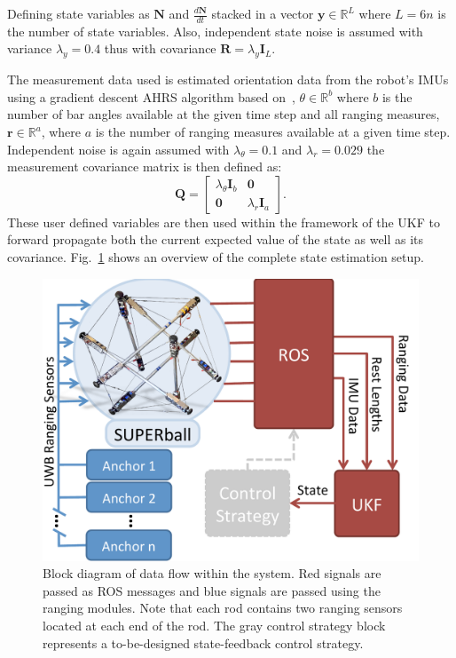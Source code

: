 {Defining state variables as $\boldsymbol{N}$ and $\frac{d\boldsymbol{N}}{dt}$ stacked in a vector $\boldsymbol{y}\in\mathbb{R}^{L}$ where $L = 6n$ is the number of state variables. 
Also, independent state noise is assumed with variance $\lambda_y = 0.4$ thus with covariance $\boldsymbol{R} = \lambda_y\bm{I}_L$.

The measurement data used is estimated orientation data from the robot's IMUs using a gradient descent AHRS algorithm based on~\cite{madgwick2011estimation}, $\theta\in\mathbb{R}^{b}$ where $b$ is the number of bar angles available at the given time step and all ranging measures, $\boldsymbol{r}\in\mathbb{R}^{a}$, where $a$ is the number of ranging measures available at a given time step.
Independent noise is again assumed with $\lambda_\theta = 0.1$ and $\lambda_r = 0.029$ the measurement covariance matrix is then defined as:
$$
\boldsymbol{Q} =  \left[ \begin{array}{ccc} \lambda_\theta\bm{I}_b & \boldsymbol{0} \\
                         \boldsymbol{0}        & \lambda_r\bm{I}_a  \end{array} \right].
$$
These user defined variables are then used within the framework of the UKF to forward propagate both the current expected value of the state as well as its covariance. 
Fig.~\ref{fig:UKFflowChart} shows an overview of the complete state estimation setup. 



\begin{figure}[tpbh]
 \centering
  \includegraphics[width=0.85\linewidth]{tex/img/flow_chartSB.pdf}
 \caption{Block diagram of data flow within the system. Red signals are passed as ROS messages and blue signals are passed using the ranging modules. Note that each rod contains two ranging sensors located at each end of the rod. The gray control strategy block represents a to-be-designed state-feedback control strategy.}
\label{fig:UKFflowChart}
 \end{figure}

}
